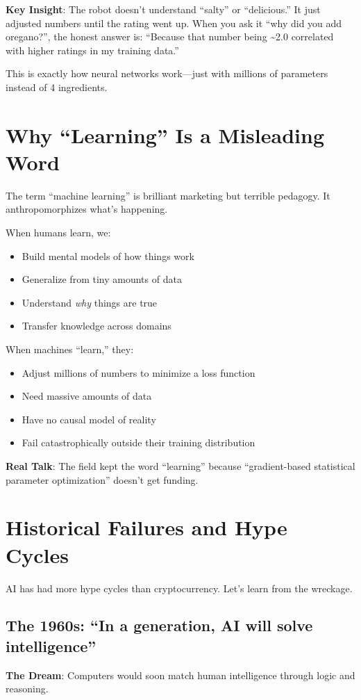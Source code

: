 \textbf{Key Insight}: The robot doesn't understand ``salty'' or ``delicious.'' It just adjusted numbers until the rating went up. When you ask it ``why did you add oregano?'', the honest answer is: ``Because that number being \textasciitilde 2.0 correlated with higher ratings in my training data.''

This is exactly how neural networks work---just with millions of parameters instead of 4 ingredients.

\section{Why ``Learning'' Is a Misleading Word}

The term ``machine learning'' is brilliant marketing but terrible pedagogy. It anthropomorphizes what's happening.

When humans learn, we:
\begin{itemize}
\item Build mental models of how things work
\item Generalize from tiny amounts of data
\item Understand \textit{why} things are true
\item Transfer knowledge across domains
\end{itemize}

When machines ``learn,'' they:
\begin{itemize}
\item Adjust millions of numbers to minimize a loss function
\item Need massive amounts of data
\item Have no causal model of reality
\item Fail catastrophically outside their training distribution
\end{itemize}

\textbf{Real Talk}: The field kept the word ``learning'' because ``gradient-based statistical parameter optimization'' doesn't get funding.

\section{Historical Failures and Hype Cycles}

AI has had more hype cycles than cryptocurrency. Let's learn from the wreckage.

\subsection{The 1960s: ``In a generation, AI will solve intelligence''}
\textbf{The Dream}: Computers would soon match human intelligence through logic and reasoning.

